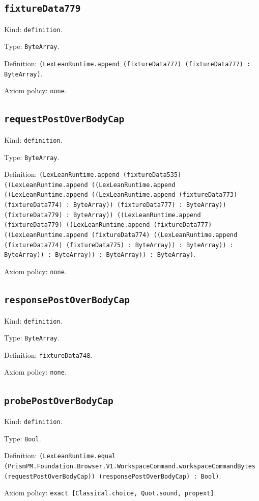 \documentclass[11pt]{article}
\begin{document}
\subsection*{\texttt{fixtureData779}}
\noindent Kind: \texttt{definition}.\par
\noindent Type: \texttt{ByteArray}.\par
\noindent Definition: \texttt{(LexLeanRuntime.append (fixtureData777) (fixtureData777) : ByteArray)}.\par
\noindent Axiom policy: \texttt{none}.\par
\subsection*{\texttt{requestPostOverBodyCap}}
\noindent Kind: \texttt{definition}.\par
\noindent Type: \texttt{ByteArray}.\par
\noindent Definition: \texttt{(LexLeanRuntime.append (fixtureData535) ((LexLeanRuntime.append ((LexLeanRuntime.append ((LexLeanRuntime.append ((LexLeanRuntime.append (fixtureData773) (fixtureData774) : ByteArray)) (fixtureData777) : ByteArray)) (fixtureData779) : ByteArray)) ((LexLeanRuntime.append (fixtureData779) ((LexLeanRuntime.append (fixtureData777) ((LexLeanRuntime.append (fixtureData774) ((LexLeanRuntime.append (fixtureData774) (fixtureData775) : ByteArray)) : ByteArray)) : ByteArray)) : ByteArray)) : ByteArray)) : ByteArray)}.\par
\noindent Axiom policy: \texttt{none}.\par
\subsection*{\texttt{responsePostOverBodyCap}}
\noindent Kind: \texttt{definition}.\par
\noindent Type: \texttt{ByteArray}.\par
\noindent Definition: \texttt{fixtureData748}.\par
\noindent Axiom policy: \texttt{none}.\par
\subsection*{\texttt{probePostOverBodyCap}}
\noindent Kind: \texttt{definition}.\par
\noindent Type: \texttt{Bool}.\par
\noindent Definition: \texttt{(LexLeanRuntime.equal (PrismPM.Foundation.Browser.V1.WorkspaceCommand.workspaceCommandBytes (requestPostOverBodyCap)) (responsePostOverBodyCap) : Bool)}.\par
\noindent Axiom policy: \texttt{exact [Classical.choice, Quot.sound, propext]}.\par
\end{document}
